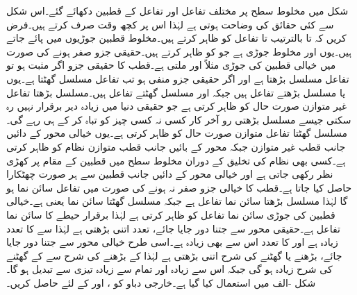 شکل  میں مخلوط سطح پر مختلف تفاعل اور تفاعل کے  قطبین  دکھائے گئے۔اس شکل سے کئی حقائق کی وضاحت ہوتی ہے لہٰذا اس پر کچھ وقت صرف کرتے ہیں۔فرض کریں کہ  تا  بالترتیب  تا  تفاعل کو ظاہر کرتے ہیں۔مخلوط قطبین جوڑیوں میں پائے جاتے ہیں۔یوں  اور  مخلوط جوڑی ہے جو  کو ظاہر کرتے ہیں۔حقیقی جزو صفر ہونے کی صورت میں خیالی قطبین کی جوڑی مثلاً  اور  ملتی ہے۔قطب کا حقیقی جزو اگر مثبت ہو تو تفاعل مسلسل بڑھتا ہے اور اگر حقیقی  جزو منفی ہو تب تفاعل مسلسل گھٹتا ہے۔یوں  یا  مسلسل بڑھتے تفاعل ہیں جبکہ  اور  مسلسل گھٹتے تفاعل ہیں۔مسلسل بڑھتا تفاعل غیر متوازن صورت حال کو ظاہر کرتی ہے جو حقیقی دنیا میں زیادہ دیر برقرار نہیں رہ سکتی جیسے مسلسل بڑھتی رو آخر کار کسی نہ کسی چیز کو تباہ کر کے ہی رہے گی۔مسلسل گھٹتا تفاعل متوازن صورت حال کو ظاہر کرتی ہے۔یوں خیالی محور کے دائیں جانب قطب غیر متوازن جبکہ محور کے بائیں جانب قطب متوازن نظام کو ظاہر کرتی ہے۔کسی بھی نظام کی تخلیق کے دوران مخلوط سطح میں قطبین کے مقام پر کھڑی نظر رکھی جاتی ہے اور خیالی محور کے دائیں جانب قطبین سے ہر صورت چھٹکارا حاصل کیا جاتا ہے۔قطب کا خیالی جزو صفر نہ ہونے کی صورت میں تفاعل سائن نما ہو گا لہٰذا  مسلسل بڑھتا سائن نما تفاعل ہے جبکہ   مسلسل گھٹتا سائن نما یعنی  ہے۔خیالی قطبین کی جوڑی سائن نما تفاعل کو ظاہر کرتی ہے لہٰذا  برقرار حیطے کا سائن نما تفاعل ہے۔حقیقی محور سے جتنا دور جایا جائے، تعدد اتنی بڑھتی ہے لہٰذا  سے  کا تعدد زیادہ ہے اور  کا تعدد اس سے بھی زیادہ ہے۔اسی طرح خیالی محور سے جتنا دور جایا جائے، بڑھنے یا گھٹنے کی شرح اتنی بڑھتی ہے لہٰذا  کے بڑھنے کی شرح سے  کے گھٹنے کی شرح زیادہ ہو گی جبکہ  اس سے زیادہ اور  تمام سے زیادہ تیزی سے تبدیل ہو گا۔
شکل -الف میں  استعمال کیا گیا ہے۔خارجی دباو  کو ،  اور  کے لئے حاصل کریں۔
